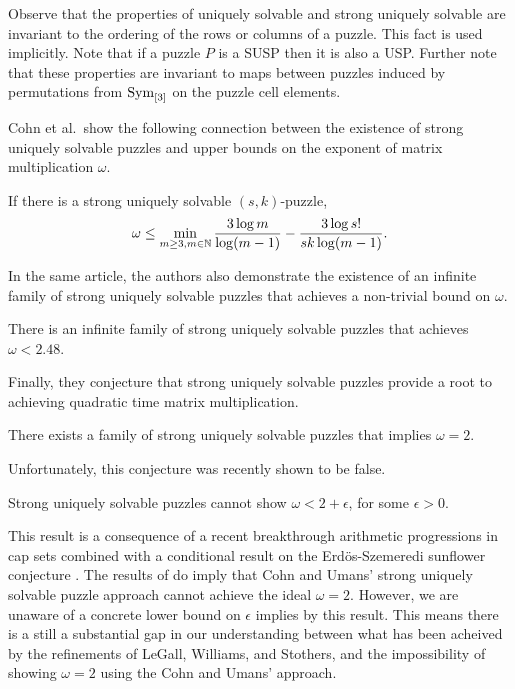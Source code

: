 \documentclass[11pt]{article}
\newcommand\Sym[1]{\ensuremath{\mathrm{Sym}_{#1}}}
\begin{document}
Observe that the properties of uniquely solvable and strong uniquely
solvable are invariant to the ordering of the rows or columns of a
puzzle.  This fact is used implicitly.  Note that if a puzzle $P$ is a
SUSP then it is also a USP.  Further note that these properties are
invariant to maps between puzzles induced by permutations from
\Sym{\ordset{3}} on the puzzle cell elements.

Cohn et al.~show the following connection between the existence of
strong uniquely solvable puzzles and upper bounds on the exponent of
matrix multiplication $\omega$.
\begin{lemma}
  If there is a strong uniquely solvable $(s,k)$-puzzle,
  $$\omega \le \min_{m \ge 3, m \in \mathbb{N}} \frac{3 \log
    m}{\log(m-1)} - \frac{3 \log s!}{sk \log(m-1)}.$$
\end{lemma}
\noindent In the same article, the authors also demonstrate the
existence of an infinite family of strong uniquely solvable puzzles
that achieves a non-trivial bound on $\omega$.
\begin{lemma}
  There is an infinite family of strong uniquely solvable puzzles that
  achieves $\omega < 2.48$.
\end{lemma}
\noindent Finally, they conjecture that strong uniquely solvable
puzzles provide a root to achieving quadratic time matrix
multiplication.
\begin{conjecture}
  There exists a family of strong uniquely solvable puzzles that
  implies $\omega = 2$.
\end{conjecture}
\noindent Unfortunately, this conjecture was recently shown to be false.
\begin{lemma}
  Strong uniquely solvable puzzles cannot show $\omega < 2 +
  \epsilon$, for some $\epsilon > 0$.
\end{lemma}
\noindent This result is a consequence of a recent breakthrough
arithmetic progressions in cap sets \cite{e16,clp16} combined with a
conditional result on the Erd\"{o}s-Szemeredi sunflower conjecture
\cite{asu13}.  The results of \cite{bccgu16} do imply that Cohn and
Umans' strong uniquely solvable puzzle approach cannot achieve the
ideal $\omega = 2$.  However, we are unaware of a concrete lower bound
on $\epsilon$ implies by this result.  This means there is a still a
substantial gap in our understanding between what has been acheived by
the refinements of LeGall, Williams, and Stothers, and the
impossibility of showing $\omega = 2$ using the Cohn and Umans'
approach.
\end{document}
